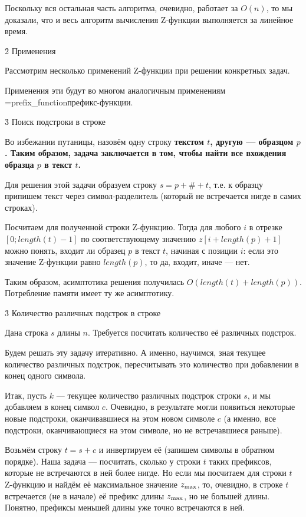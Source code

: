 Поскольку вся остальная часть алгоритма, очевидно, работает за $O (n)$, то мы доказали, что и весь алгоритм вычисления Z-функции выполняется за линейное время.



\h2{ Применения }

Рассмотрим несколько применений Z-функции при решении конкретных задач.

Применения эти будут во многом аналогичным применениям \algohref=prefix_function{префикс-функции}.


\h3{ Поиск подстроки в строке }

Во избежании путаницы, назовём одну строку \bf{текстом} $t$, другую --- \bf{образцом} $p$. Таким образом, задача заключается в том, чтобы найти все вхождения образца $p$ в текст $t$.

Для решения этой задачи образуем строку $s = p + \# + t$, т.е. к образцу припишем текст через символ-разделитель (который не встречается нигде в самих строках).

Посчитаем для полученной строки Z-функцию. Тогда для любого $i$ в отрезке $[0; length(t)-1]$ по соответствующему значению $z[i + length(p) + 1]$ можно понять, входит ли образец $p$ в текст $t$, начиная с позиции $i$: если это значение Z-функции равно $length(p)$, то да, входит, иначе --- нет.

Таким образом, асимптотика решения получилась $O (length(t) + length(p))$. Потребление памяти имеет ту же асимптотику.


\h3{ Количество различных подстрок в строке }

Дана строка $s$ длины $n$. Требуется посчитать количество её различных подстрок.

Будем решать эту задачу итеративно. А именно, научимся, зная текущее количество различных подстрок, пересчитывать это количество при добавлении в конец одного символа.

Итак, пусть $k$ --- текущее количество различных подстрок строки $s$, и мы добавляем в конец символ $c$. Очевидно, в результате могли появиться некоторые новые подстроки, оканчивавшиеся на этом новом символе $c$ (а именно, все подстроки, оканчивающиеся на этом символе, но не встречавшиеся раньше).

Возьмём строку $t=s+c$ и инвертируем её (запишем символы в обратном порядке). Наша задача --- посчитать, сколько у строки $t$ таких префиксов, которые не встречаются в ней более нигде. Но если мы посчитаем для строки $t$ Z-функцию и найдём её максимальное значение $z_{\rm max}$, то, очевидно, в строке $t$ встречается (не в начале) её префикс длины $z_{\rm max}$, но не большей длины. Понятно, префиксы меньшей длины уже точно встречаются в ней.

